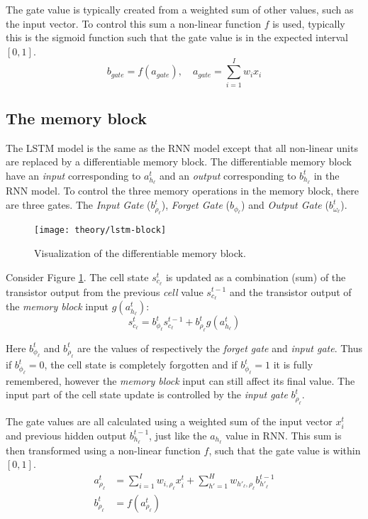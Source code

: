 The gate value is typically created from a weighted sum of other values, such as the input vector. To control this sum a non-linear function $f$ is used, typically this is the sigmoid function such that the gate value is in the expected interval $[0, 1]$.
\begin{equation}
b_{gate} = f(a_{gate}), \quad a_{gate} = \sum_{i=1}^I w_i x_i
\end{equation}

\subsection{The memory block}

The LSTM model is the same as the RNN model except that all non-linear units are replaced by a differentiable memory block. The differentiable memory block have an \textit{input} corresponding to $a_{h_\ell}^t$ and an \textit{output} corresponding to $b_{h_\ell}^t$ in the RNN model. To control the three memory operations in the memory block, there are three gates. The \textit{Input Gate} ($b_{\rho_\ell}^t$), \textit{Forget Gate} ($b_{\phi_\ell}$) and \textit{Output Gate} ($b_{\omega_\ell}^t$).

\begin{figure}[h]
	\centering
	\texttt{[image: theory/lstm-block]}
	\caption{Visualization of the differentiable memory block.}
	\label{fig:theory:lstm:lstm-block}
\end{figure}

Consider Figure \ref{fig:theory:lstm:lstm-block}. The cell state $s_{c_\ell}^t$ is updated as a combination (sum) of the transistor output from the previous \textit{cell} value $s_{c_\ell}^{t-1}$ and the transistor output of the \textit{memory block} input $g(a_{h_\ell}^t)$:
\begin{equation}
s_{c_\ell}^t = b_{\phi_\ell}^t s_{c_\ell}^{t-1} + b_{\rho_\ell}^t g(a_{h_\ell}^t)
\end{equation}

Here $b_{\phi_\ell}^t$ and $b_{\rho_\ell}^t$ are the values of respectively the \textit{forget gate} and \textit{input gate}. Thus if $b_{\phi_\ell}^t = 0$, the cell state is completely forgotten and if $b_{\phi_\ell}^t = 1$ it is fully remembered, however the \textit{memory block} input can still affect its final value. The input part of the cell state update is controlled by the \textit{input gate} $b_{\rho_\ell}^t$. 

The gate values are all calculated using a weighted sum of the input vector $x_i^t$ and previous hidden output $b_{h_\ell}^{t-1}$, just like the $a_{h_\ell}$ value in RNN. This sum is then transformed using a non-linear function $f$, such that the gate value is within $[0, 1]$.
\begin{equation}
\begin{aligned}
a_{\rho_\ell}^t &= \sum_{i=1}^I w_{i, \rho_\ell} x_i^t + \sum_{h'=1}^H w_{h'_\ell, \rho_\ell} b_{h'_\ell}^{t-1} \\
b_{\rho_\ell}^t &= f(a_{\rho_\ell}^t)
\end{aligned}
\label{eq:theory:lstm:gate-value-example}
\end{equation}

